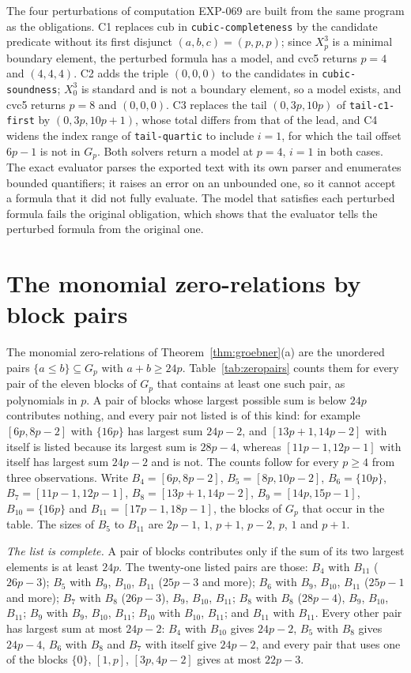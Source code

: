 \documentclass[11pt]{article}
\theoremstyle{definition}
\theoremstyle{remark}
\begin{document}
The four perturbations of computation EXP-069 are built from the same program as the
obligations. C1 replaces $\mathrm{cub}$ in \texttt{cubic-completeness} by the candidate predicate without
its first disjunct $(a,b,c)=(p,p,p)$; since $X_p^3$ is a minimal boundary element, the perturbed
formula has a model, and cvc5 returns $p=4$ and $(4,4,4)$. C2 adds the triple $(0,0,0)$ to
the candidates in \texttt{cubic-soundness}; $X_0^3$ is standard and is not a boundary element, so a model
exists, and cvc5 returns $p=8$ and $(0,0,0)$. C3 replaces the tail $(0,3p,10p)$ of
\texttt{tail-c1-first} by $(0,3p,10p+1)$, whose total differs from that of the lead, and C4 widens the
index range of \texttt{tail-quartic} to include $i=1$, for which the tail offset $6p-1$ is not in $G_p$.
Both solvers return a model at $p=4$, $i=1$ in both cases. The exact evaluator parses the exported
text with its own parser and enumerates bounded quantifiers; it raises an error on an unbounded one,
so it cannot accept a formula that it did not fully evaluate. The model that satisfies each
perturbed formula fails the original obligation, which shows that the evaluator tells the perturbed
formula from the original one.

\section{The monomial zero-relations by block pairs}\label{app:zero}

The monomial zero-relations of Theorem~\ref{thm:groebner}(a) are the unordered pairs
$\{a\leq b\}\subseteq G_p$ with $a+b\geq24p$. Table~\ref{tab:zeropairs} counts them for every pair of the
eleven blocks of $G_p$ that contains at least one such pair, as polynomials in $p$. A pair of
blocks whose largest possible sum is below $24p$ contributes nothing, and every pair not listed is of
this kind: for example $[6p,8p-2]$ with $\{16p\}$ has largest sum $24p-2$, and $[13p+1,14p-2]$ with
itself is listed because its largest sum is $28p-4$, whereas $[11p-1,12p-1]$ with itself has largest
sum $24p-2$ and is not. The counts follow for every $p\geq4$ from three observations. Write
$B_4=[6p,8p-2]$, $B_5=[8p,10p-2]$, $B_6=\{10p\}$, $B_7=[11p-1,12p-1]$, $B_8=[13p+1,14p-2]$,
$B_9=[14p,15p-1]$, $B_{10}=\{16p\}$ and $B_{11}=[17p-1,18p-1]$, the blocks of $G_p$ that occur in
the table. The sizes of $B_5$ to $B_{11}$ are $2p-1$, $1$, $p+1$, $p-2$, $p$, $1$ and $p+1$.

\emph{The list is complete.} A pair of blocks contributes only if the sum of its two largest
elements is at least $24p$. The twenty-one listed pairs are those: $B_4$ with $B_{11}$ ($26p-3$);
$B_5$ with $B_9$, $B_{10}$, $B_{11}$ ($25p-3$ and more); $B_6$ with $B_9$, $B_{10}$, $B_{11}$
($25p-1$ and more); $B_7$ with $B_8$ ($26p-3$), $B_9$, $B_{10}$, $B_{11}$; $B_8$ with $B_8$
($28p-4$), $B_9$, $B_{10}$, $B_{11}$; $B_9$ with $B_9$, $B_{10}$, $B_{11}$; $B_{10}$ with $B_{10}$,
$B_{11}$; and $B_{11}$ with $B_{11}$. Every other pair has largest sum at most $24p-2$: $B_4$ with
$B_{10}$ gives $24p-2$, $B_5$ with $B_8$ gives $24p-4$, $B_6$ with $B_8$ and $B_7$ with itself give
$24p-2$, and every pair that uses one of the blocks $\{0\}$, $[1,p]$, $[3p,4p-2]$ gives at most
$22p-3$.
\end{document}
